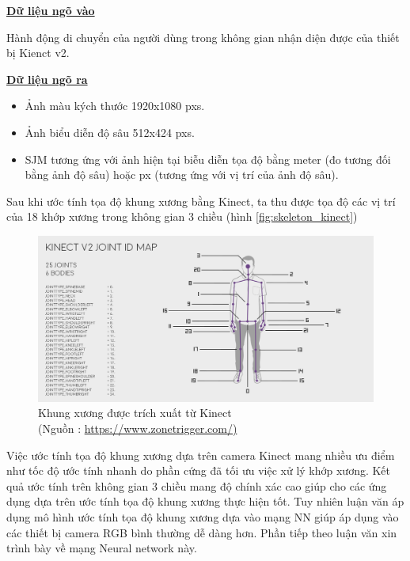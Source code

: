 \underline{\textbf{Dữ liệu ngõ vào}}

Hành động di chuyển của người dùng trong không gian nhận diện được của thiết bị Kienct v2.

\underline{\textbf{Dữ liệu ngõ ra}}
\begin{itemize}
\item Ảnh màu kých thước 1920x1080 pxs.

\item Ảnh biểu diễn độ sâu 512x424 pxs.

\item SJM tương ứng với ảnh hiện tại biễu diễn tọa độ bằng meter (đo tương đối bằng ảnh độ sâu) hoặc px (tương ứng với vị trí của ảnh độ sâu).
\end{itemize}

Sau khi ước tính tọa độ khung xương bằng Kinect, ta thu được tọa độ các vị trí của 18 khớp xương trong không gian 3 chiều (hình \ref{fig:skeleton_kinect})

\FloatBarrier
\begin{figure}[htp]
\begin{center}
\includegraphics[scale=0.4]{chap3/c3_figs/kinectskeleton.png}
\end{center}
\caption{Khung xương được trích xuất từ Kinect \\(Nguồn : \url{https://www.zonetrigger.com/)}}
\label{fig:kinect}
\end{figure}
\FloatBarrier

Việc ước tính tọa độ khung xương dựa trên camera Kinect mang nhiều ưu điểm như tốc độ ước tính nhanh do phần cứng đã tối ưu việc xử lý khớp xương. Kết quả ước tính trên không gian 3 chiều mang độ chính xác cao giúp cho các ứng dụng dựa trên ước tính tọa độ khung xương thực hiện tốt. Tuy nhiên luận văn áp dụng mô hình ước tính tọa độ khung xương dựa vào mạng NN giúp áp dụng vào các thiết bị camera RGB bình thường dễ dàng hơn. Phần tiếp theo luận văn xin trình bày về mạng Neural network này.

